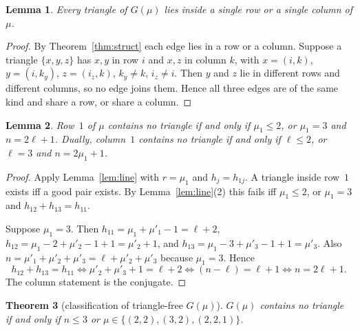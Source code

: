 \documentclass[11pt]{article}
\newtheorem{theorem}{Theorem}[section]
\newtheorem{lemma}[theorem]{Lemma}
\theoremstyle{definition}
\begin{document}
\begin{lemma}\label{lem:tricol}
Every triangle of $G(\mu)$ lies inside a single row or a single column of $\mu$.
\end{lemma}

\begin{proof}
By Theorem~\ref{thm:struct} each edge lies in a row or a column. Suppose a triangle $\{x,y,z\}$
has $x,y$ in row $i$ and $x,z$ in column $k$, with $x=(i,k)$, $y=(i,k_y)$, $z=(i_z,k)$,
$k_y\ne k$, $i_z\ne i$. Then $y$ and $z$ lie in different rows and different columns, so no
edge joins them. Hence all three edges are of the same kind and share a row, or share a column.
\end{proof}

\begin{lemma}\label{lem:row1}
Row~$1$ of $\mu$ contains no triangle if and only if $\mu_1\le2$, or $\mu_1=3$ and $n=2\ell+1$.
Dually, column~$1$ contains no triangle if and only if $\ell\le2$, or $\ell=3$ and
$n=2\mu_1+1$.
\end{lemma}

\begin{proof}
Apply Lemma~\ref{lem:line} with $r=\mu_1$ and $h_j=h_{1j}$. A triangle inside row~$1$ exists
iff a good pair exists. By Lemma~\ref{lem:line}(2) this fails iff $\mu_1\le2$, or $\mu_1=3$ and
$h_{12}+h_{13}=h_{11}$.

Suppose $\mu_1=3$. Then $h_{11}=\mu_1+\mu'_1-1=\ell+2$, $h_{12}=\mu_1-2+\mu'_2-1+1=\mu'_2+1$,
and $h_{13}=\mu_1-3+\mu'_3-1+1=\mu'_3$. Also $n=\mu'_1+\mu'_2+\mu'_3=\ell+\mu'_2+\mu'_3$
because $\mu_1=3$. Hence
\[
   h_{12}+h_{13}=h_{11}
   \iff \mu'_2+\mu'_3+1=\ell+2
   \iff (n-\ell)=\ell+1
   \iff n=2\ell+1 .
\]
The column statement is the conjugate.
\end{proof}

\begin{theorem}[classification of triangle-free $G(\mu)$]\label{thm:tri}
$G(\mu)$ contains no triangle if and only if $n\le3$ or $\mu\in\{(2,2),(3,2),(2,2,1)\}$.
\end{theorem}
\end{document}
